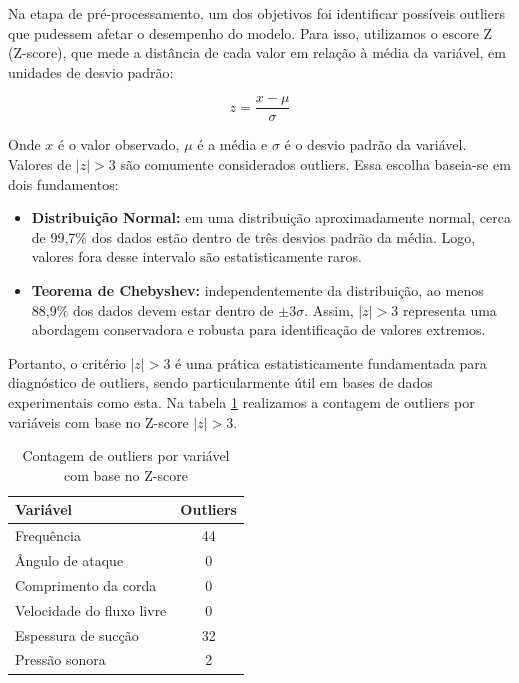 \documentclass[12pt,a4paper,oneside]{report}
\begin{document}
Na etapa de pré-processamento, um dos objetivos foi identificar possíveis outliers que pudessem afetar o desempenho do modelo. Para isso, utilizamos o escore Z (Z-score), que mede a distância de cada valor em relação à média da variável, em unidades de desvio padrão:

\begin{equation}
	z = \frac{x - \mu}{\sigma}
\end{equation}

Onde $x$ é o valor observado, $\mu$ é a média e $\sigma$ é o desvio padrão da variável. Valores de $|z| > 3$ são comumente considerados outliers. Essa escolha baseia-se em dois fundamentos:

\begin{itemize}
	\item \textbf{Distribuição Normal:} em uma distribuição aproximadamente normal, cerca de 99,7\% dos dados estão dentro de três desvios padrão da média. Logo, valores fora desse intervalo são estatisticamente raros.
	\item \textbf{Teorema de Chebyshev\cite{wiki:2025}:} independentemente da distribuição, ao menos 88,9\% dos dados devem estar dentro de $\pm 3\sigma$. Assim, $|z| > 3$ representa uma abordagem conservadora e robusta para identificação de valores extremos.
\end{itemize}

Portanto, o critério $|z| > 3$ é uma prática estatisticamente fundamentada para diagnóstico de outliers, sendo particularmente útil em bases de dados experimentais como esta. Na tabela \ref{tab:outliers_variables} realizamos a contagem de outliers por variáveis com base no Z-score $|z| > 3$.
\begin{table}[H]
	\centering
	\caption{Contagem de outliers por variável com base no Z-score}
	\label{tab:outliers_variables}
	\begin{tabular}{l c}
		\toprule
		\textbf{Variável} & \textbf{Outliers} \\
		\midrule
		Frequência                     & 44 \\
		Ângulo de ataque              & 0 \\
		Comprimento da corda          & 0 \\
		Velocidade do fluxo livre     & 0 \\
		Espessura de sucção           & 32 \\
		Pressão sonora                & 2 \\
		\bottomrule
	\end{tabular}
\end{table}
	
\end{document}

